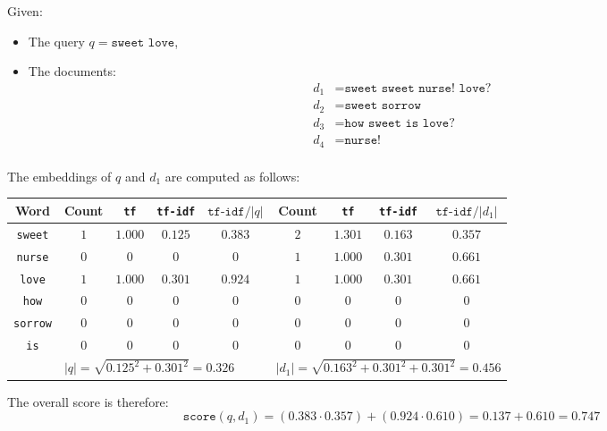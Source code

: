 \begin{description}
\begin{description}
                \begin{example}
                    Given:
                    \begin{itemize}
                        \item The query $q = \texttt{sweet love}$,
                        \item The documents:
                        \[
                            \begin{split}
                                d_1 &= \texttt{sweet sweet nurse! love?} \\
                                d_2 &= \texttt{sweet sorrow} \\
                                d_3 &= \texttt{how sweet is love?} \\
                                d_4 &= \texttt{nurse!} \\
                            \end{split}
                        \]
                    \end{itemize}
                    The embeddings of $q$ and $d_1$ are computed as follows:
                    \begin{table}[H]
                        \centering
                        \footnotesize
                        \begin{tabular}{c|cccc|cccc}
                            \toprule
                            \textbf{Word} & \textbf{Count} & \texttt{tf} & \texttt{tf-idf} & $\texttt{tf-idf}/|q|$ & \textbf{Count} & \texttt{tf} & \texttt{tf-idf} & $\texttt{tf-idf}/|d_1|$ \\
                            \midrule
                            \texttt{sweet}  & $1$ & $1.000$ & $0.125$ & $0.383$ & $2$ & $1.301$ & $0.163$ & $0.357$ \\
                            \texttt{nurse}  & $0$ & $0$     & $0$     & $0$     & $1$ & $1.000$ & $0.301$ & $0.661$ \\
                            \texttt{love}   & $1$ & $1.000$ & $0.301$ & $0.924$ & $1$ & $1.000$ & $0.301$ & $0.661$ \\
                            \texttt{how}    & $0$ & $0$     & $0$     & $0$     & $0$ & $0$     & $0$     & $0$ \\
                            \texttt{sorrow} & $0$ & $0$     & $0$     & $0$     & $0$ & $0$     & $0$     & $0$ \\
                            \texttt{is}     & $0$ & $0$     & $0$     & $0$     & $0$ & $0$     & $0$     & $0$ \\
                            \midrule
                            & \multicolumn{4}{l|}{$|q| = \sqrt{0.125^2 + 0.301^2} = 0.326$} & \multicolumn{4}{l}{$|d_1| = \sqrt{0.163^2 + 0.301^2 + 0.301^2} = 0.456$} \\
                            \bottomrule
                        \end{tabular}
                    \end{table}
                    The overall score is therefore:
                    \[ \texttt{score}(q, d_1) = (0.383 \cdot 0.357) + (0.924 \cdot 0.610) = 0.137 + 0.610 = 0.747 \]


\end{example}
\end{description}
\end{description}
